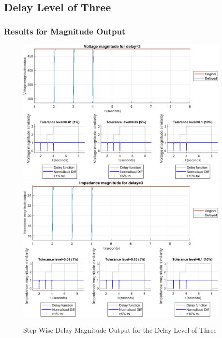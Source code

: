 \subsection{Delay Level of Three}
\subsubsection{Results for Magnitude Output}

\begin{figure}
    \caption{Step-Wise Delay Magnitude Output for the Delay Level of Three}
    \includegraphics[width=0.95\textwidth]{PMUsim-figures/DelayOf_3/Step_vMagnitude.png}    
      \includegraphics[width=0.95\textwidth]{PMUsim-figures/DelayOf_3/Step_iMagnitude.png}      
    \label{fig:PMUsimStep_Three_Magnitude}
    \begin{small}
     \end{small}
\end{figure}

